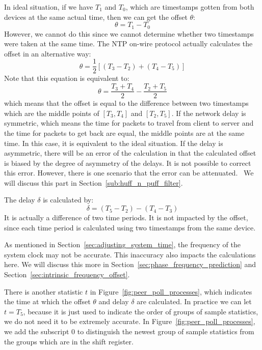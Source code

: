 In ideal situation, if we have $T_1$ and $T_0$, which are timestamps gotten
from both devices at the same actual time, then we can get the offset $\theta$:
$$\theta = T_1 - T_0$$
However, we cannot do this since we cannot determine whether two timestamps
were taken at the same time. The NTP on-wire protocol actually calculates the
offset in an alternative way:
\begin{equation}
    \theta = \frac{1}{2}\left[(T_3 - T_2) + (T_4 - T_5)\right]
    \label{eq:offset_def}
\end{equation}
Note that this equation is equivalent to:
$$\theta = \frac{T_3 + T_4}{2} - \frac{T_2 + T_5}{2}$$
which means that the offset is equal to the difference between two timestamps
which are the middle points of $[T_3, T_4]$ and $[T_2, T_5]$. 
If the network delay is symmetric, which means the time for packets to travel
from client to server and the time for packets to get back are equal, the
middle points are at the same time. In this case, it is equivalent to the ideal
situation. If the delay is asymmetric, there will be an error of the
calculation in that the calculated offset is biased by the degree of asymmetry
of the delays. It is not possible to correct this error. However, there is one
scenario that the error can be attenuated.~\cite{redbook} We will discuss this
part in Section~\ref{sub:huff_n_puff_filter}.

The delay $\delta$ is calculated by:
\begin{equation}
    \delta = (T_5 - T_2) - (T_4 - T_3)
    \label{eq:delay_def}
\end{equation}
It is actually a difference of two time periods. It is not impacted by the
offset, since each time period is calculated using two timestamps from the same
device. 

As mentioned in Section~\ref{sec:adjusting_system_time}, the frequency of 
the system clock may not be accurate. This inaccuracy also impacts the
calculations here. We will discuss this more in
Section~\ref{sec:phase_frequency_prediction} and
Section~\ref{sec:intrinsic_frequency_offset}.

There is another statistic $t$ in Figure~\ref{fig:peer_poll_processes}, which
indicates the time at which the offset $\theta$ and delay $\delta$ are
calculated.  In practice we can let $t = T_5$, because it is just used to
indicate the order of groups of sample statistics, we do not need it to be
extremely accurate.  In Figure~\ref{fig:peer_poll_processes}, we add the
subscript 0 to distinguish the newest group of sample statistics from the
groups which are in the shift register.

